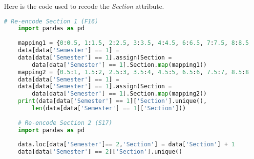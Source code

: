 \documentclass{article}
\begin{document}
Here is the code used to recode the \textit{Section} attribute.
    \begin{lstlisting}[language=Python]
    # Re-encode Section 1 (F16)
    import pandas as pd
    
    mapping1 = {0:0.5, 1:1.5, 2:2.5, 3:3.5, 4:4.5, 6:6.5, 7:7.5, 8:8.5, 9:9.5}
    data[data['Semester'] == 1] = 
    data[data['Semester'] == 1].assign(Section = 
        data[data['Semester'] == 1].Section.map(mapping1))
    mapping2 = {0.5:1, 1.5:2, 2.5:3, 3.5:4, 4.5:5, 6.5:6, 7.5:7, 8.5:8, 9.5:9}
    data[data['Semester'] == 1] = 
    data[data['Semester'] == 1].assign(Section = 
        data[data['Semester'] == 1].Section.map(mapping2))
    print(data[data['Semester'] == 1]['Section'].unique(),
        len(data[data['Semester'] == 1]['Section']))
    
    # Re-encode Section 2 (S17)
    import pandas as pd
    
    data.loc[data['Semester']== 2,'Section'] = data['Section'] + 1
    data[data['Semester'] == 2]['Section'].unique()
    \end{lstlisting}
\end{document}
